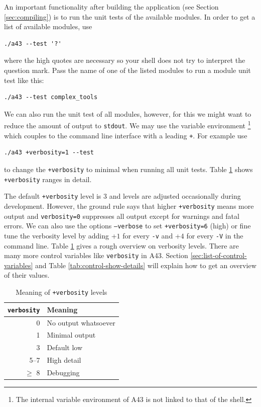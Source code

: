 \documentclass[oribibl]{llncs}
\newcommand{\ttt}[1]{\texttt{#1}}
\newcommand{\codename}{A43}
\begin{document}
\noindent
An important functionality after building the application (see Section \ref{sec:compiling})
is to run the unit tests of the available modules.
In order to get a list of available modules, use 
\begin{verbatim}
./a43 --test '?'
\end{verbatim}
where the high quotes are necessary so your shell does not try to interpret the question mark.
Pass the name of one of the listed modules to run a module unit test like this:
\begin{verbatim}
./a43 --test complex_tools
\end{verbatim}
We can also run the unit test of all modules, however, for this we might want to reduce
the amount of output to \ttt{stdout}.
We may use the variable environment 
\footnote{The internal variable environment of \codename{} is not linked to that of the shell.}
which couples to the command line interface with a leading \ttt{+}. For example use
\begin{verbatim}
./a43 +verbosity=1 --test
\end{verbatim}
to change the \ttt{+verbosity} to minimal when running all unit tests.
Table \ref{tab:verbosity-level-meaning} shows \ttt{+verbosity} ranges in detail.


\noindent
The default \ttt{+verbosity} level is $3$ and levels are adjusted occasionally during development.
However, the ground rule says that higher \ttt{+verbosity} means more output
and \ttt{verbosity=0} suppresses all output except for warnings and fatal errors.
We can also use the options \ttt{--verbose} to set \ttt{+verbosity=6} (high)
or fine tune the verbosity level by adding +$1$ for every \ttt{-v} and +$4$ for every \ttt{-V} in the command line.
Table \ref{tab:verbosity-level-meaning} gives a rough overview on verbosity levels.
\noindent
There are many more control variables like \ttt{verbosity} in \codename{}.
Section \ref{sec:list-of-control-variables} and Table \ref{tab:control-show-details} 
will explain how to get an overview of their values.


\begin{table}[ht!]
\caption[Meaning of verbosity levels]{
Meaning of \ttt{+verbosity} levels
} \label{tab:verbosity-level-meaning}
\centering
\begin{tabular}{|r|l|}
\hline
  \ttt{verbosity} & Meaning   \\
\hline
     0 & No output whatsoever \\
     1 & Minimal output       \\
     3 & Default low          \\
  5--7 & High detail          \\
   $\geq$ 8 & Debugging       \\
\hline
\end{tabular}
\end{table}
\end{document}
